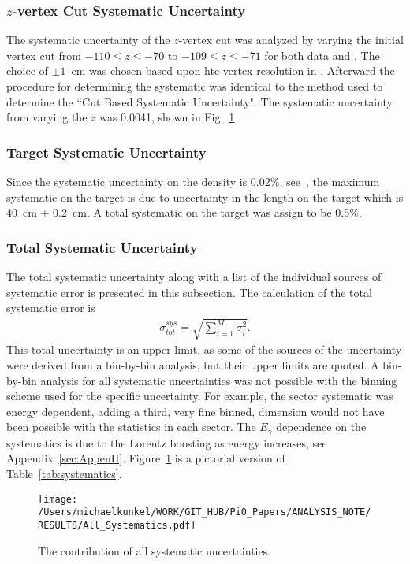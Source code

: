 \subsubsection{$z$-vertex Cut Systematic Uncertainty}\label{sec:zsystematic}
The systematic uncertainty of the $z$-vertex cut was analyzed by varying the initial vertex cut from $-110 \le z \le -70$ to $-109 \le z \le -71$ for both data and . The choice of $\pm 1$~cm was chosen based upon hte vertex resolution in . Afterward the procedure for determining the systematic was identical to the method used to determine the ``Cut Based Systematic Uncertainty". The systematic uncertainty from varying the $z$ was 0.0041, shown in Fig.~\ref{fig:results.syserr}

\subsubsection{Target Systematic Uncertainty}
Since the systematic uncertainty on the density is 0.02\%, see~\cite{g12note}, the maximum systematic on the target is due to uncertainty in the length on the target which is 40~cm $\pm$ 0.2~cm. A total systematic on the target was assign to be 0.5\%. 

\subsubsection{Total Systematic Uncertainty}
The total systematic uncertainty along with a list of the individual sources of systematic error is presented in this subsection. The calculation of the total systematic error is 
\begin{align}
\sigma^{sys}_{tot} = \sqrt{\sum_{i=1}^{M}\sigma_i^2} .
\end{align}
This total uncertainty is an upper limit, as some of the sources of the uncertainty were derived from a bin-by-bin analysis, but their upper limits are quoted. A bin-by-bin analysis for all systematic uncertainties was not possible with the binning scheme used for the specific uncertainty. For example, the sector systematic was energy dependent, adding a third, very fine binned, dimension would not have been possible with the statistics in each sector. The $E_{\gamma}$ dependence on the systematics is due to the Lorentz boosting as energy increases, see Appendix~\ref{sec:AppenII}. Figure~\ref{fig:results.syserr} is a pictorial version of Table~\ref{tab:systematics}.

\begin{figure}[h!]\begin{center}
\texttt{[image: /Users/michaelkunkel/WORK/GIT\_HUB/Pi0\_Papers/ANALYSIS\_NOTE/RESULTS/All\_Systematics.pdf]}
\caption[The contribution of all systematic uncertainties]{\label{fig:results.syserr}The contribution of all systematic uncertainties.}
\end{center}\end{figure}
\FloatBarrier

